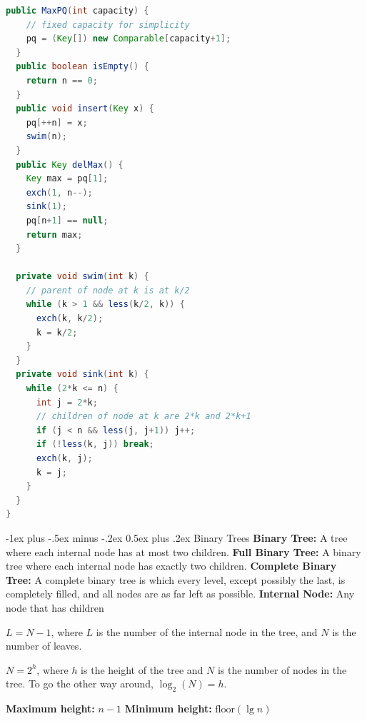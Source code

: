 \documentclass[letterpaper, 8pt]{extarticle}
\makeatletter
\renewcommand{\section}{\@startsection{section}{1}{0mm}%
                                {-1ex plus -.5ex minus -.2ex}%
                                {0.5ex plus .2ex}%
                                {\normalfont\normalsize\bfseries}}
\makeatother
\begin{document}
\begin{multicols*}{4}
\begin{lstlisting}[language=Java, breaklines=true, postbreak=\mbox{\textcolor{red}{$\hookrightarrow$}\space}]
  public MaxPQ(int capacity) {
    // fixed capacity for simplicity
    pq = (Key[]) new Comparable[capacity+1];
  }
  public boolean isEmpty() {
    return n == 0;
  }
  public void insert(Key x) {
    pq[++n] = x;
    swim(n);
  }
  public Key delMax() {
    Key max = pq[1];
    exch(1, n--);
    sink(1);
    pq[n+1] == null;
    return max;
  }

  private void swim(int k) {
    // parent of node at k is at k/2
    while (k > 1 && less(k/2, k)) {
      exch(k, k/2);
      k = k/2;
    }
  }
  private void sink(int k) {
    while (2*k <= n) {
      int j = 2*k;
      // children of node at k are 2*k and 2*k+1
      if (j < n && less(j, j+1)) j++;
      if (!less(k, j)) break;
      exch(k, j);
      k = j;
    }
  }
}
  \end{lstlisting}

  \section{Binary Trees}
  \textbf{Binary Tree:} A tree where each internal node has at most two children.
  \textbf{Full Binary Tree:} A binary tree where each internal node has exactly two children.
  \textbf{Complete Binary Tree:} A complete binary tree is which every level,
  except possibly the last, is completely filled, and all nodes are as far left as possible.
  \textbf{Internal Node:} Any node that has children

  $L = N - 1$, where $L$ is the number of the internal node in the tree,
  and $N$ is the number of leaves.

  $N = 2^h$, where $h$ is the height of the tree and $N$ is the number of nodes in the tree.
  To go the other way around, $\log_2(N) = h$.

  \textbf{Maximum height:} $n - 1$
  \textbf{Minimum height:} $\text{floor}(\lg n)$


\end{multicols*}
\end{document}
